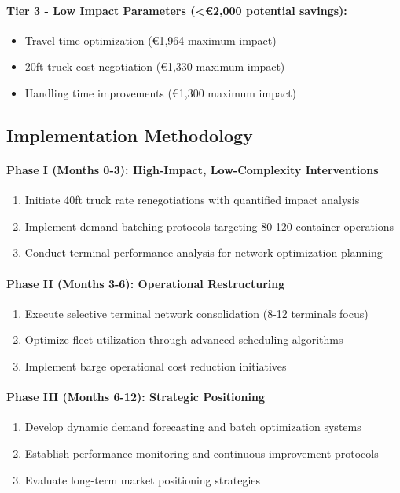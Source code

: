 \documentclass[12pt,a4paper]{article}
\begin{document}
\paragraph{Tier 3 - Low Impact Parameters (<€2,000 potential savings):}
\begin{itemize}
    \item Travel time optimization (€1,964 maximum impact)
    \item 20ft truck cost negotiation (€1,330 maximum impact)
    \item Handling time improvements (€1,300 maximum impact)
\end{itemize}

\subsection{Implementation Methodology}

\paragraph{Phase I (Months 0-3): High-Impact, Low-Complexity Interventions}
\begin{enumerate}
    \item Initiate 40ft truck rate renegotiations with quantified impact analysis
    \item Implement demand batching protocols targeting 80-120 container operations
    \item Conduct terminal performance analysis for network optimization planning
\end{enumerate}

\paragraph{Phase II (Months 3-6): Operational Restructuring}
\begin{enumerate}
    \item Execute selective terminal network consolidation (8-12 terminals focus)
    \item Optimize fleet utilization through advanced scheduling algorithms
    \item Implement barge operational cost reduction initiatives
\end{enumerate}

\paragraph{Phase III (Months 6-12): Strategic Positioning}
\begin{enumerate}
    \item Develop dynamic demand forecasting and batch optimization systems
    \item Establish performance monitoring and continuous improvement protocols
    \item Evaluate long-term market positioning strategies
\end{enumerate}
\end{document}
